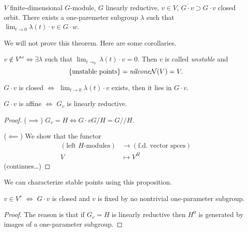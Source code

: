 \begin{theorem}
\label{theorem-Hilbert-Mumford-criterion}
$V$ finite-dimensional $G$-module, $G$ linearly reductive, $v \in V$,
$\overline{G\cdot v}\supset G\cdot v$ closed orbit. There exists a one-paremeter
subgroup $\lambda$ such that $\lim_{t \to 0} \lambda(t)\cdot v \in G\cdot w$.
\end{theorem}

We will not prove this theorem. Here are some corollaries.

\begin{lemma}
\label{lemma-unstable}
$v \not \in V^{ss} \iff \exists  \lambda$ such that 
$\lim_{t\to_0}\lambda(t)\cdot v =0$. Then $v$ is called {\it unstable} and 
$$
\{\text{unstable points}\}=\text{{\it nilcone}} \mathcal{N}(V)=V.
$$
\end{lemma}

\begin{lemma}
\label{lemma-orbit-is-closed-iff-limit-lies-in-orbit}
$G\cdot v$ is closed $\iff$ $\lim_{t \to 0} \lambda(t)\cdot v$ exists, then it
lies in $G\cdot v$.
\end{lemma}

\begin{proposition}
\label{proposition-orbit-is-affine-iff-stabilizer-is-linearly-reductive}
$G\cdot v$ is affine $\iff$ $G_v$ is linearly reductive.
\end{proposition}

\begin{proof}
($\implies$) $G_v = H \iff G\cdot v G/H=G//H$.

($\impliedby$) We show that the functor
\begin{align*}
(\text{left $H$-modules}) &\longrightarrow (\text{f.d. vector spces}) \\
V &\longmapsto V^H
\end{align*}
(continues…)
\end{proof}

We can characterize stable points using this proposition.

\begin{lemma}
\label{lemma-stable-point-iff-orbit-is-closed-and-not-fixed-by-nontrivial-1PS}
$v \in V^s$ $\iff$ $G\cdot v$ is closed and $v$ is fixed by no nontrivial
one-parameter subgroup.
\end{lemma}

\begin{proof}
The reason is that if $G_v=H$ is linearly reductive then $H^0$ is generated by
images of a one-parameter subgroup.
\end{proof}

